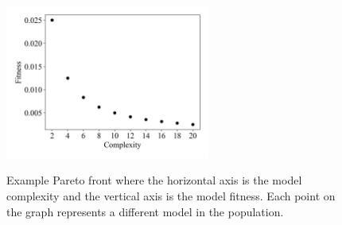 \begin{figure}
    \centering
    \includegraphics[width=0.6\textwidth]{Figures/dummy_pareto_front.png}
    \label{fig:perato-front}
    \caption{Example Pareto front where the horizontal axis is the model complexity and the vertical axis is the model fitness. Each point on the graph represents a different model in the population.} 
\end{figure}




 